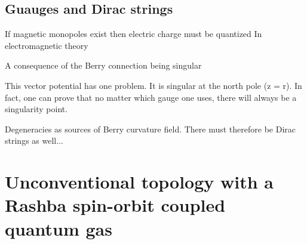 



\subsection{Guauges and Dirac strings}

If magnetic monopoles exist then electric charge must be quantized
In electromagnetic theory 

A consequence of the Berry connection being singular 

This vector potential has one problem. It is singular at the north pole (z = r). In fact, one can prove that no matter which gauge one uses, there will always be a singularity point.

Degeneracies as sources of Berry curvature field. There must therefore be Dirac strings as well...


\section{Unconventional topology with a Rashba spin-orbit coupled quantum gas}




